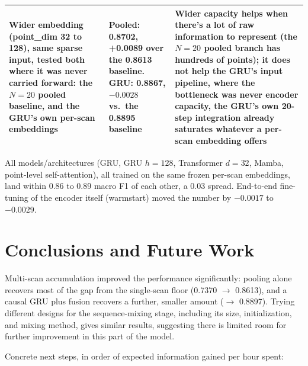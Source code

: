 \documentclass[10pt,letterpaper]{IEEEtran}
\begin{document}
\begin{table}[t]
\begin{tabular}{p{}p{}p{}}
    \addlinespace
    Wider embedding (point\_dim 32 to 128), same sparse input, tested both where it was never carried forward: the $N=20$ pooled baseline, and the GRU's own per-scan embeddings & Pooled: 0.8702, +0.0089 over the 0.8613 baseline. GRU: 0.8867, $-0.0028$ vs.\ the 0.8895 baseline & Wider capacity helps when there's a lot of raw information to represent (the $N=20$ pooled branch has hundreds of points); it does not help the GRU's input pipeline, where the bottleneck was never encoder capacity, the GRU's own 20-step integration already saturates whatever a per-scan embedding offers \\
    \bottomrule
  \end{tabular}
\end{table}

All models/architectures (GRU, GRU $h=128$, Transformer $d=32$, Mamba,
point-level self-attention), all trained on the same frozen per-scan
embeddings, land within 0.86 to 0.89 macro F1 of each other, a 0.03 spread.
End-to-end fine-tuning of the encoder itself (warmstart) moved the number by
$-0.0017$ to $-0.0029$.

\section{Conclusions and Future Work}

Multi-scan accumulation improved the performance significantly: pooling
alone recovers most of the gap from the single-scan floor (0.7370
$\to$ 0.8613), and a causal GRU plus fusion recovers a further, smaller
amount ($\to$ 0.8897). Trying different designs for the sequence-mixing
stage, including its size, initialization, and mixing method, gives similar
results, suggesting there is limited room for further improvement in this
part of the model.

Concrete next steps, in order of expected information gained per hour spent:
\end{document}
